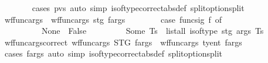 \begin{isabellebody}
%
\isadelimproof
\ \ \ \ \ \ %
\endisadelimproof
%
\isatagproof
{}\isamarkupfalse%
\ {\isacharparenleft}{\kern0pt}cases\ pvs{\isacharparenright}{\kern0pt}\ {\isacharparenleft}{\kern0pt}auto\ simp{\isacharcolon}{\kern0pt}\ is{\isacharunderscore}{\kern0pt}of{\isacharunderscore}{\kern0pt}type{\isacharprime}{\kern0pt}{\isacharunderscore}{\kern0pt}correct{\isacharbrackleft}{\kern0pt}abs{\isacharunderscore}{\kern0pt}def{\isacharbrackright}{\kern0pt}\ split{\isacharcolon}{\kern0pt}option{\isachardot}{\kern0pt}split{\isacharparenright}{\kern0pt}%
\endisatagproof
{\isafoldproof}%
%
\isadelimproof
\isanewline
%
\endisadelimproof
\isanewline
\ \ \ \ \isamarkupfalse%
\ wf{\isacharunderscore}{\kern0pt}func{\isacharunderscore}{\kern0pt}args{\isacharprime}{\kern0pt}\ \ {\isachardoublequoteopen}wf{\isacharunderscore}{\kern0pt}func{\isacharunderscore}{\kern0pt}args{\isacharprime}{\kern0pt}\ stg\ {\isacharparenleft}{\kern0pt}f{\isacharcomma}{\kern0pt}args{\isacharparenright}{\kern0pt}\ {\isasymlongleftrightarrow}\ \isanewline
\ \ \ \ \ \ {\isacharparenleft}{\kern0pt}case\ func{\isacharunderscore}{\kern0pt}sig\ f\ of\isanewline
\ \ \ \ \ \ \ \ \ \ None\ {\isasymRightarrow}\ False\isanewline
\ \ \ \ \ \ \ \ {\isacharbar}{\kern0pt}\ Some\ Ts\ {\isasymRightarrow}\ list{\isacharunderscore}{\kern0pt}all{}\ {\isacharparenleft}{\kern0pt}is{\isacharunderscore}{\kern0pt}of{\isacharunderscore}{\kern0pt}type{\isacharprime}{\kern0pt}\ stg{\isacharparenright}{\kern0pt}\ args\ Ts{\isacharparenright}{\kern0pt}{\isachardoublequoteclose}\isanewline
\isanewline
\ \ \ \ \isamarkupfalse%
\ wf{\isacharunderscore}{\kern0pt}func{\isacharunderscore}{\kern0pt}args{\isacharprime}{\kern0pt}{\isacharunderscore}{\kern0pt}correct{\isacharcolon}{\kern0pt}\ {\isachardoublequoteopen}wf{\isacharunderscore}{\kern0pt}func{\isacharunderscore}{\kern0pt}args{\isacharprime}{\kern0pt}\ STG\ fargs\ {\isacharequal}{\kern0pt}\ wf{\isacharunderscore}{\kern0pt}func{\isacharunderscore}{\kern0pt}args\ ty{\isacharunderscore}{\kern0pt}ent\ fargs{\isachardoublequoteclose}\isanewline
%
\isadelimproof
\ \ \ \ \ \ %
\endisadelimproof
%
\isatagproof
{}\isamarkupfalse%
\ {\isacharparenleft}{\kern0pt}cases\ fargs{\isacharparenright}{\kern0pt}\ {\isacharparenleft}{\kern0pt}auto\ simp{\isacharcolon}{\kern0pt}\ is{\isacharunderscore}{\kern0pt}of{\isacharunderscore}{\kern0pt}type{\isacharprime}{\kern0pt}{\isacharunderscore}{\kern0pt}correct{\isacharbrackleft}{\kern0pt}abs{\isacharunderscore}{\kern0pt}def{\isacharbrackright}{\kern0pt}\ split{\isacharcolon}{\kern0pt}option{\isachardot}{\kern0pt}split{\isacharparenright}{\kern0pt}%

\end{isabellebody}
